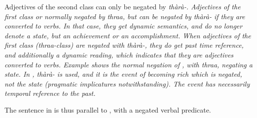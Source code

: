 

Adjectives of the second class can only be negated by \em thàrà-\em. Adjectives of the first class or normally negated by \em thraa\em, but can be negated by \em thàrà- \em if they are converted to verbs. In that case, they get dynamic semantics, and do no longer denote a state, but an achievement or an accomplishment.
When adjectives of the first class (\em thraa\em-class) are negated with \em thàrà-\em, they do get past time reference, and additionally a dynamic reading, which indicates that they are adjectives converted to verbs. Example  shows the normal negation of , with \em thraa\em, negating a state. In , \em thàrà- \em is used, and it is the event of becoming rich which is negated, not the state (pragmatic implicatures notwithstanding). The event has necessarily temporal reference to the past.



The sentence in  is thus parallel to , with a negated verbal predicate.


